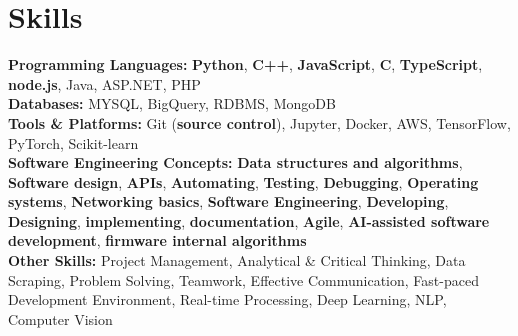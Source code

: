 \documentclass[a4paper,10pt]{article}
\begin{document}
\section*{Skills}
\textbf{Programming Languages: } \textbf{Python}, \textbf{C++}, \textbf{JavaScript}, \textbf{C}, \textbf{TypeScript}, \textbf{node.js}, Java, ASP.NET, PHP \\
\textbf{Databases: } MYSQL, BigQuery, RDBMS, MongoDB \\
\textbf{Tools \& Platforms: } Git (\textbf{source control}), Jupyter, Docker, AWS, TensorFlow, PyTorch, Scikit-learn \\
\textbf{Software Engineering Concepts: } \textbf{Data structures and algorithms}, \textbf{Software design}, \textbf{APIs}, \textbf{Automating}, \textbf{Testing}, \textbf{Debugging}, \textbf{Operating systems}, \textbf{Networking basics}, \textbf{Software Engineering}, \textbf{Developing}, \textbf{Designing}, \textbf{implementing}, \textbf{documentation}, \textbf{Agile}, \textbf{AI-assisted software development}, \textbf{firmware internal algorithms} \\
\textbf{Other Skills: } Project Management, Analytical \& Critical Thinking, Data Scraping, Problem Solving, Teamwork, Effective Communication, Fast-paced Development Environment, Real-time Processing, Deep Learning, NLP, Computer Vision \\

\vspace{-4mm}
\end{document}
